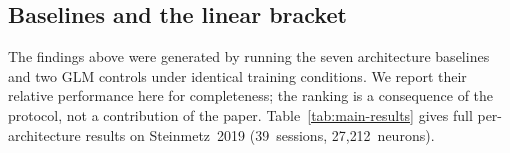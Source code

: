 \documentclass{article}
\begin{document}

\subsection{Baselines and the linear bracket}
\label{sec:arch-results}

The findings above were generated by running the seven architecture
baselines and two GLM controls under identical training conditions.
We report their relative performance here for completeness; the
ranking is a consequence of the protocol, not a contribution of the
paper.  Table~\ref{tab:main-results} gives full per-architecture
results on Steinmetz~2019 (39~sessions, 27{,}212~neurons).
\end{document}
